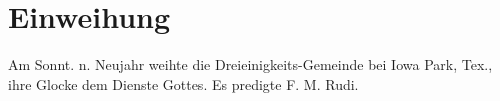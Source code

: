 \chapter{Einweihung}

Am Sonnt. n. Neujahr weihte die Dreieinigkeits-Gemeinde bei Iowa Park, Tex., ihre Glocke dem Dienste Gottes. Es predigte F. M. Rudi.
